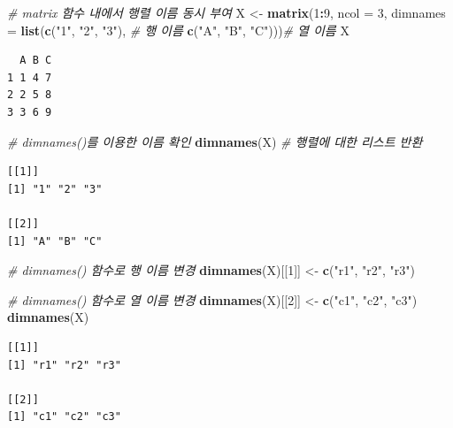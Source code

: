 \documentclass[
  11pt,
]{krantz}
\newenvironment{Shaded}{\begin{snugshade}}{\end{snugshade}}
\newcommand{\CommentTok}[1]{\textcolor[rgb]{0.37,0.37,0.37}{\textit{#1}}}
\newcommand{\DataTypeTok}[1]{\textcolor[rgb]{0.27,0.27,0.27}{#1}}
\newcommand{\DecValTok}[1]{\textcolor[rgb]{0.06,0.06,0.06}{#1}}
\newcommand{\KeywordTok}[1]{\textcolor[rgb]{0.27,0.27,0.27}{\textbf{#1}}}
\newcommand{\NormalTok}[1]{#1}
\newcommand{\OperatorTok}[1]{\textcolor[rgb]{0.43,0.43,0.43}{\textbf{#1}}}
\newcommand{\StringTok}[1]{\textcolor[rgb]{0.5,0.5,0.5}{#1}}
\begin{document}
\footnotesize

\begin{Shaded}
\begin{Highlighting}[]
\CommentTok{# matrix 함수 내에서 행렬 이름 동시 부여}
\NormalTok{X <-}\StringTok{ }\KeywordTok{matrix}\NormalTok{(}\DecValTok{1}\OperatorTok{:}\DecValTok{9}\NormalTok{, }\DataTypeTok{ncol =} \DecValTok{3}\NormalTok{, }
            \DataTypeTok{dimnames =} \KeywordTok{list}\NormalTok{(}\KeywordTok{c}\NormalTok{(}\StringTok{"1"}\NormalTok{, }\StringTok{"2"}\NormalTok{, }\StringTok{"3"}\NormalTok{), }\CommentTok{# 행 이름}
                            \KeywordTok{c}\NormalTok{(}\StringTok{"A"}\NormalTok{, }\StringTok{"B"}\NormalTok{, }\StringTok{"C"}\NormalTok{)))}\CommentTok{# 열 이름}
\NormalTok{X}
\end{Highlighting}
\end{Shaded}

\begin{verbatim}
  A B C
1 1 4 7
2 2 5 8
3 3 6 9
\end{verbatim}

\begin{Shaded}
\begin{Highlighting}[]
\CommentTok{# dimnames()를 이용한 이름 확인}
\KeywordTok{dimnames}\NormalTok{(X) }\CommentTok{# 행렬에 대한 리스트 반환}
\end{Highlighting}
\end{Shaded}

\begin{verbatim}
[[1]]
[1] "1" "2" "3"

[[2]]
[1] "A" "B" "C"
\end{verbatim}

\begin{Shaded}
\begin{Highlighting}[]
\CommentTok{# dimnames() 함수로 행 이름 변경}
\KeywordTok{dimnames}\NormalTok{(X)[[}\DecValTok{1}\NormalTok{]] <-}\StringTok{ }\KeywordTok{c}\NormalTok{(}\StringTok{"r1"}\NormalTok{, }\StringTok{"r2"}\NormalTok{, }\StringTok{"r3"}\NormalTok{)}

\CommentTok{# dimnames() 함수로 열 이름 변경}
\KeywordTok{dimnames}\NormalTok{(X)[[}\DecValTok{2}\NormalTok{]] <-}\StringTok{ }\KeywordTok{c}\NormalTok{(}\StringTok{"c1"}\NormalTok{, }\StringTok{"c2"}\NormalTok{, }\StringTok{"c3"}\NormalTok{)}
\KeywordTok{dimnames}\NormalTok{(X)}
\end{Highlighting}
\end{Shaded}

\begin{verbatim}
[[1]]
[1] "r1" "r2" "r3"

[[2]]
[1] "c1" "c2" "c3"
\end{verbatim}
\end{document}
